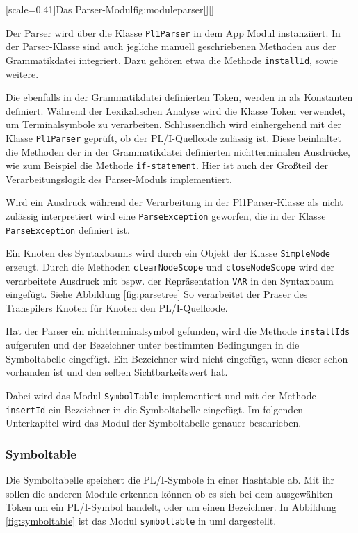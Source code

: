 [scale=0.41]{Das Parser-Modul}{fig:moduleparser}[][]
\pagebreak

Der Parser wird über die Klasse \verb+Pl1Parser+ in dem App Modul instanziiert. In der Parser-Klasse sind auch jegliche manuell geschriebenen Methoden aus der Grammatikdatei integriert. 
Dazu gehören etwa die Methode \verb+installId+, sowie weitere. 

Die ebenfalls in der Grammatikdatei definierten Token, 
werden in  als Konstanten definiert. 
Während der Lexikalischen Analyse wird die Klasse Token verwendet, um Terminalsymbole zu verarbeiten. 
Schlussendlich wird einhergehend mit der Klasse \verb+Pl1Parser+ geprüft, ob der PL/I-Quellcode zulässig ist. 
Diese beinhaltet die Methoden der in der Grammatikdatei definierten nichtterminalen Ausdrücke, wie zum Beispiel die Methode \verb+if-statement+. 
Hier ist auch der Großteil der Verarbeitungslogik des Parser-Moduls implementiert.

Wird ein Ausdruck während der Verarbeitung in der Pl1Parser-Klasse als nicht zulässig  interpretiert wird eine \verb+ParseException+ geworfen, die in der Klasse \verb+ParseException+ definiert ist.

Ein Knoten des Syntaxbaums wird durch ein Objekt der Klasse \verb+SimpleNode+ erzeugt. Durch die Methoden \verb+clearNodeScope+ und \verb+closeNodeScope+ wird der verarbeitete Ausdruck mit bspw. der Repräsentation \verb+VAR+ in den Syntaxbaum eingefügt. 
Siehe Abbildung \ref{fig:parsetree} So verarbeitet der Praser des Transpilers Knoten für Knoten den PL/I-Quellcode. 

Hat der Parser ein nichtterminalsymbol gefunden, wird die Methode \verb+installIds+ aufgerufen und der Bezeichner unter bestimmten Bedingungen in die Symboltabelle eingefügt. 
Ein Bezeichner wird nicht eingefügt, 
wenn dieser schon vorhanden ist und den selben Sichtbarkeitswert hat.

Dabei wird das Modul \verb+SymbolTable+ implementiert und mit der Methode \verb+insertId+ ein Bezeichner in die Symboltabelle eingefügt. Im folgenden Unterkapitel wird das Modul der Symboltabelle genauer beschrieben. 

\pagebreak
\subsubsection{Symboltable}
Die Symboltabelle speichert die PL/I-Symbole in einer Hashtable ab. Mit ihr sollen die anderen Module
erkennen können ob es sich bei dem ausgewählten Token um ein PL/I-Symbol handelt, oder um einen Bezeichner.
In Abbildung \ref{fig:symboltable} ist das Modul \verb+symboltable+ in \ac{uml} dargestellt.

